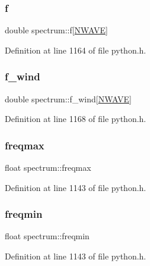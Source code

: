\subsubsection{\texorpdfstring{f}{f}}
{\footnotesize\ttfamily double spectrum\+::f\mbox{[}\hyperlink{python_8h_a466538c019bc48c22053d7807c5ac843}{N\+W\+A\+VE}\mbox{]}}



Definition at line 1164 of file python.\+h.

\mbox{\label{structspectrum_a460853aa5df0174e31b6a406b251a4ec}} 
\subsubsection{\texorpdfstring{f\+\_\+wind}{f\_wind}}
{\footnotesize\ttfamily double spectrum\+::f\+\_\+wind\mbox{[}\hyperlink{python_8h_a466538c019bc48c22053d7807c5ac843}{N\+W\+A\+VE}\mbox{]}}



Definition at line 1168 of file python.\+h.

\mbox{\label{structspectrum_a1e3c6efa1f0d8438e84990b4e69db44e}} 
\subsubsection{\texorpdfstring{freqmax}{freqmax}}
{\footnotesize\ttfamily float spectrum\+::freqmax}



Definition at line 1143 of file python.\+h.

\mbox{\label{structspectrum_a70a161ec46644eea82821d77c20b13ca}} 
\subsubsection{\texorpdfstring{freqmin}{freqmin}}
{\footnotesize\ttfamily float spectrum\+::freqmin}



Definition at line 1143 of file python.\+h.

\mbox{\label{structspectrum_a4173b2f5a467bc28d72c7c8e4c321ca5}} 
